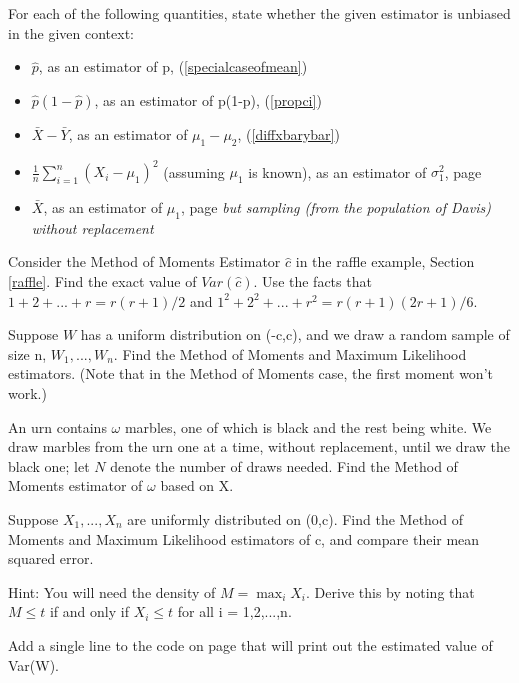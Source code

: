 \oneproblem
For each of the following quantities, state whether the given
estimator is unbiased in the given context:

\begin{itemize}

\item $\hat{p}$, as an estimator of p, (\ref{specialcaseofmean})

\item $\hat{p} (1-\hat{p})$, as an estimator of p(1-p), (\ref{propci})

\item $\bar{X} - \bar{Y}$, as an estimator of $\mu_1 - \mu_2$,
(\ref{diffxbarybar})

\item $\frac{1}{n} \sum_{i=1}^n (X_i-\mu_1)^2$ (assuming $\mu_1$ is
known), as an estimator of $\sigma_1^2$, 
page \pageref{diffxbarybar}

\item $\bar{X}$, as an estimator of $\mu_1$, 
page \pageref{diffxbarybar}
{\it but
sampling (from the population of Davis) without replacement}

\end{itemize}

\oneproblem
Consider the Method of Moments Estimator $\hat{c}$ in the raffle
example, Section \ref{raffle}.  Find the exact value of $Var(\hat{c})$.
Use the facts that $1+2+...+r = r(r+1)/2$ and $1^2+2^2+...+r^2 =
r(r+1)(2r+1)/6$.

\oneproblem
Suppose $W$ has a uniform distribution on (-c,c), and we draw a random
sample of size n, $W_1,...,W_n$.  Find the Method of Moments and Maximum
Likelihood estimators.  (Note that in the Method of Moments case, the
first moment won't work.)

\oneproblem
An urn contains $\omega$ marbles, one of which is black and the rest
being white.  We draw marbles from the urn one at a time, without
replacement, until we draw the black one; let $N$ denote the number of
draws needed.  Find the Method of Moments estimator of $\omega$ based on
X.

\oneproblem
Suppose $X_1,...,X_n$ are uniformly distributed on (0,c).  Find the
Method of Moments and Maximum Likelihood estimators of c, and compare
their mean squared error.

Hint:  You will need the density of $M = \max_i X_i$.  Derive this by
noting that $M \le t$ if and only if $X_i \leq t$ for all i = 1,2,...,n.

\oneproblem
Add a single line to the code on page \pageref{bussim} that will print out the
estimated value of Var(W).


